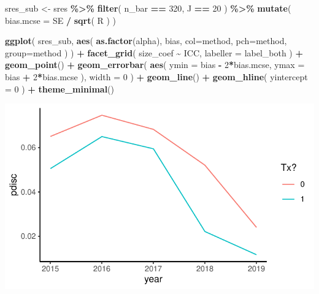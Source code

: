 \documentclass[
]{book}
\newenvironment{Shaded}{\begin{snugshade}}{\end{snugshade}}
\newcommand{\AttributeTok}[1]{\textcolor[rgb]{0.13,0.29,0.53}{#1}}
\newcommand{\DecValTok}[1]{\textcolor[rgb]{0.00,0.00,0.81}{#1}}
\newcommand{\FunctionTok}[1]{\textcolor[rgb]{0.13,0.29,0.53}{\textbf{#1}}}
\newcommand{\NormalTok}[1]{#1}
\newcommand{\OtherTok}[1]{\textcolor[rgb]{0.56,0.35,0.01}{#1}}
\newcommand{\SpecialCharTok}[1]{\textcolor[rgb]{0.81,0.36,0.00}{\textbf{#1}}}
\begin{document}
\begin{Shaded}
\begin{Highlighting}[]
\NormalTok{sres\_sub }\OtherTok{\textless{}{-}} 
\NormalTok{  sres }\SpecialCharTok{\%\textgreater{}\%}
  \FunctionTok{filter}\NormalTok{( n\_bar }\SpecialCharTok{==} \DecValTok{320}\NormalTok{, J }\SpecialCharTok{==} \DecValTok{20}\NormalTok{ ) }\SpecialCharTok{\%\textgreater{}\%}
  \FunctionTok{mutate}\NormalTok{( }\AttributeTok{bias.mcse =}\NormalTok{ SE }\SpecialCharTok{/} \FunctionTok{sqrt}\NormalTok{( R ) )}

\FunctionTok{ggplot}\NormalTok{( sres\_sub, }\FunctionTok{aes}\NormalTok{( }\FunctionTok{as.factor}\NormalTok{(alpha), bias, }
                       \AttributeTok{col=}\NormalTok{method, }\AttributeTok{pch=}\NormalTok{method, }\AttributeTok{group=}\NormalTok{method ) ) }\SpecialCharTok{+}
  \FunctionTok{facet\_grid}\NormalTok{( size\_coef }\SpecialCharTok{\textasciitilde{}}\NormalTok{ ICC, }\AttributeTok{labeller =}\NormalTok{ label\_both ) }\SpecialCharTok{+}
  \FunctionTok{geom\_point}\NormalTok{() }\SpecialCharTok{+} 
  \FunctionTok{geom\_errorbar}\NormalTok{( }\FunctionTok{aes}\NormalTok{( }\AttributeTok{ymin =}\NormalTok{ bias }\SpecialCharTok{{-}} \DecValTok{2}\SpecialCharTok{*}\NormalTok{bias.mcse, }
                      \AttributeTok{ymax =}\NormalTok{ bias }\SpecialCharTok{+} \DecValTok{2}\SpecialCharTok{*}\NormalTok{bias.mcse ), }
                 \AttributeTok{width =} \DecValTok{0}\NormalTok{ ) }\SpecialCharTok{+}
  \FunctionTok{geom\_line}\NormalTok{() }\SpecialCharTok{+}
  \FunctionTok{geom\_hline}\NormalTok{( }\AttributeTok{yintercept =} \DecValTok{0}\NormalTok{ ) }\SpecialCharTok{+}
  \FunctionTok{theme\_minimal}\NormalTok{() }
\end{Highlighting}
\end{Shaded}

\begin{center}\includegraphics[width=0.75\linewidth]{Designing-Simulations-in-R_files/figure-latex/unnamed-chunk-249-1} \end{center}
\end{document}
